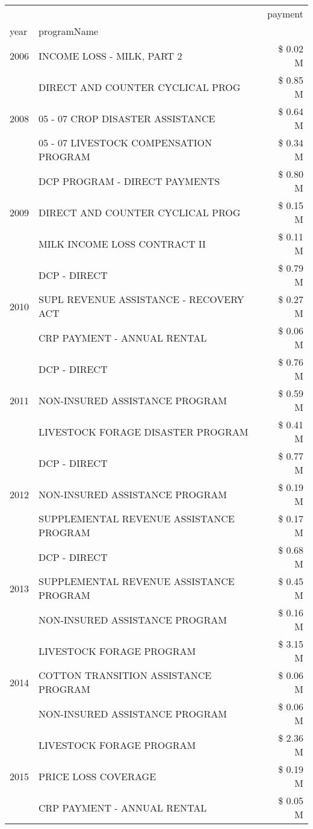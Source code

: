 \begin{tabular}{llr}
\toprule
 &  & payment \\
year & programName &  \\
\midrule
2006 & INCOME LOSS - MILK, PART 2 & \$ 0.02 M \\
\cline{1-3}
\multirow[t]{3}{*}{2008} & DIRECT AND COUNTER CYCLICAL PROG & \$ 0.85 M \\
 & 05 - 07 CROP DISASTER ASSISTANCE & \$ 0.64 M \\
 & 05 - 07 LIVESTOCK COMPENSATION PROGRAM & \$ 0.34 M \\
\cline{1-3}
\multirow[t]{3}{*}{2009} & DCP PROGRAM - DIRECT PAYMENTS & \$ 0.80 M \\
 & DIRECT AND COUNTER CYCLICAL PROG & \$ 0.15 M \\
 & MILK INCOME LOSS CONTRACT II & \$ 0.11 M \\
\cline{1-3}
\multirow[t]{3}{*}{2010} & DCP - DIRECT & \$ 0.79 M \\
 & SUPL REVENUE ASSISTANCE - RECOVERY ACT & \$ 0.27 M \\
 & CRP PAYMENT - ANNUAL RENTAL & \$ 0.06 M \\
\cline{1-3}
\multirow[t]{3}{*}{2011} & DCP - DIRECT & \$ 0.76 M \\
 & NON-INSURED ASSISTANCE PROGRAM & \$ 0.59 M \\
 & LIVESTOCK FORAGE DISASTER PROGRAM & \$ 0.41 M \\
\cline{1-3}
\multirow[t]{3}{*}{2012} & DCP - DIRECT & \$ 0.77 M \\
 & NON-INSURED ASSISTANCE PROGRAM & \$ 0.19 M \\
 & SUPPLEMENTAL REVENUE ASSISTANCE PROGRAM & \$ 0.17 M \\
\cline{1-3}
\multirow[t]{3}{*}{2013} & DCP - DIRECT & \$ 0.68 M \\
 & SUPPLEMENTAL REVENUE ASSISTANCE PROGRAM & \$ 0.45 M \\
 & NON-INSURED ASSISTANCE PROGRAM & \$ 0.16 M \\
\cline{1-3}
\multirow[t]{3}{*}{2014} & LIVESTOCK FORAGE PROGRAM & \$ 3.15 M \\
 & COTTON TRANSITION ASSISTANCE PROGRAM & \$ 0.06 M \\
 & NON-INSURED ASSISTANCE PROGRAM & \$ 0.06 M \\
\cline{1-3}
\multirow[t]{3}{*}{2015} & LIVESTOCK FORAGE PROGRAM & \$ 2.36 M \\
 & PRICE LOSS COVERAGE & \$ 0.19 M \\
 & CRP PAYMENT - ANNUAL RENTAL & \$ 0.05 M \\

\end{tabular}
